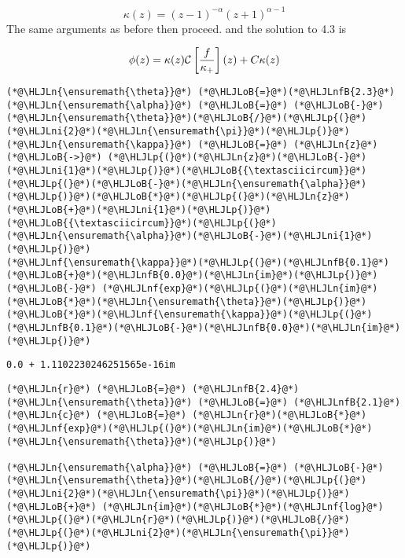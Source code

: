 \documentclass[12pt,landscape]{article}
\newcommand{\HLJLn}[1]{#1}
\newcommand{\HLJLnf}[1]{\textcolor[RGB]{66,102,213}{#1}}
\newcommand{\HLJLnfB}[1]{\textcolor[RGB]{59,151,46}{#1}}
\newcommand{\HLJLni}[1]{\textcolor[RGB]{59,151,46}{#1}}
\newcommand{\HLJLoB}[1]{\textcolor[RGB]{102,102,102}{\textbf{#1}}}
\newcommand{\HLJLp}[1]{#1}
\def\CC{ {\cal C} }
\def\br[#1]{\left[{#1}\right]}
\begin{document}
{\[
\kappa(z) = (z-1)^{-\alpha} (z+1)^{\alpha-1}
\]
The same arguments as before then proceed. and the solution to 4.3 is

\[
\phi(z) = \kappa(z) \CC\br[{f \over \kappa_+}](z)+ C \kappa(z)
\]

\begin{lstlisting}
(*@\HLJLn{\ensuremath{\theta}}@*) (*@\HLJLoB{=}@*)(*@\HLJLnfB{2.3}@*)
(*@\HLJLn{\ensuremath{\alpha}}@*) (*@\HLJLoB{=}@*) (*@\HLJLoB{-}@*)(*@\HLJLn{\ensuremath{\theta}}@*)(*@\HLJLoB{/}@*)(*@\HLJLp{(}@*)(*@\HLJLni{2}@*)(*@\HLJLn{\ensuremath{\pi}}@*)(*@\HLJLp{)}@*)
(*@\HLJLn{\ensuremath{\kappa}}@*) (*@\HLJLoB{=}@*) (*@\HLJLn{z}@*) (*@\HLJLoB{->}@*) (*@\HLJLp{(}@*)(*@\HLJLn{z}@*)(*@\HLJLoB{-}@*)(*@\HLJLni{1}@*)(*@\HLJLp{)}@*)(*@\HLJLoB{{\textasciicircum}}@*)(*@\HLJLp{(}@*)(*@\HLJLoB{-}@*)(*@\HLJLn{\ensuremath{\alpha}}@*)(*@\HLJLp{)}@*)(*@\HLJLoB{*}@*)(*@\HLJLp{(}@*)(*@\HLJLn{z}@*)(*@\HLJLoB{+}@*)(*@\HLJLni{1}@*)(*@\HLJLp{)}@*)(*@\HLJLoB{{\textasciicircum}}@*)(*@\HLJLp{(}@*)(*@\HLJLn{\ensuremath{\alpha}}@*)(*@\HLJLoB{-}@*)(*@\HLJLni{1}@*)(*@\HLJLp{)}@*)
(*@\HLJLnf{\ensuremath{\kappa}}@*)(*@\HLJLp{(}@*)(*@\HLJLnfB{0.1}@*)(*@\HLJLoB{+}@*)(*@\HLJLnfB{0.0}@*)(*@\HLJLn{im}@*)(*@\HLJLp{)}@*) (*@\HLJLoB{-}@*) (*@\HLJLnf{exp}@*)(*@\HLJLp{(}@*)(*@\HLJLn{im}@*)(*@\HLJLoB{*}@*)(*@\HLJLn{\ensuremath{\theta}}@*)(*@\HLJLp{)}@*)(*@\HLJLoB{*}@*)(*@\HLJLnf{\ensuremath{\kappa}}@*)(*@\HLJLp{(}@*)(*@\HLJLnfB{0.1}@*)(*@\HLJLoB{-}@*)(*@\HLJLnfB{0.0}@*)(*@\HLJLn{im}@*)(*@\HLJLp{)}@*)
\end{lstlisting}

\begin{lstlisting}
0.0 + 1.1102230246251565e-16im
\end{lstlisting}


\begin{lstlisting}
(*@\HLJLn{r}@*) (*@\HLJLoB{=}@*) (*@\HLJLnfB{2.4}@*)
(*@\HLJLn{\ensuremath{\theta}}@*) (*@\HLJLoB{=}@*) (*@\HLJLnfB{2.1}@*)
(*@\HLJLn{c}@*) (*@\HLJLoB{=}@*) (*@\HLJLn{r}@*)(*@\HLJLoB{*}@*)(*@\HLJLnf{exp}@*)(*@\HLJLp{(}@*)(*@\HLJLn{im}@*)(*@\HLJLoB{*}@*)(*@\HLJLn{\ensuremath{\theta}}@*)(*@\HLJLp{)}@*)

(*@\HLJLn{\ensuremath{\alpha}}@*) (*@\HLJLoB{=}@*) (*@\HLJLoB{-}@*)(*@\HLJLn{\ensuremath{\theta}}@*)(*@\HLJLoB{/}@*)(*@\HLJLp{(}@*)(*@\HLJLni{2}@*)(*@\HLJLn{\ensuremath{\pi}}@*)(*@\HLJLp{)}@*) (*@\HLJLoB{+}@*) (*@\HLJLn{im}@*)(*@\HLJLoB{*}@*)(*@\HLJLnf{log}@*)(*@\HLJLp{(}@*)(*@\HLJLn{r}@*)(*@\HLJLp{)}@*)(*@\HLJLoB{/}@*)(*@\HLJLp{(}@*)(*@\HLJLni{2}@*)(*@\HLJLn{\ensuremath{\pi}}@*)(*@\HLJLp{)}@*)


\end{lstlisting}}
\end{document}
